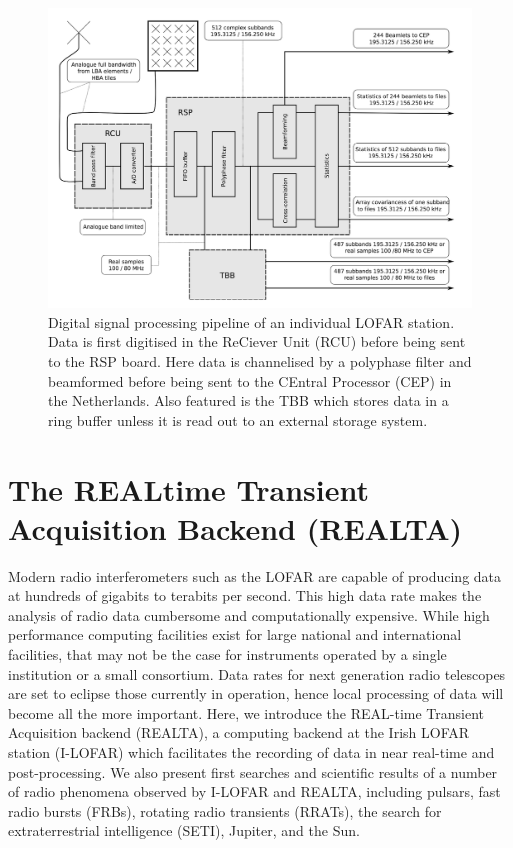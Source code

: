 \begin{figure}[ht]
    \centering
    \includegraphics[width=0.75\columnwidth]{Images/Digital_signal_processing.png}
    \caption[Digital signal processing pipeline of an individual LOFAR station.]{Digital signal processing pipeline of an individual LOFAR station. Data is first digitised in the ReCiever Unit (RCU) before being sent to the RSP board. Here data is channelised by a polyphase filter and beamformed before being sent to the CEntral Processor (CEP) in the Netherlands. Also featured is the TBB which stores data in a ring buffer unless it is read out to an external storage system. }
    \label{fig:sig_pipe}
\end{figure}

\section{The REALtime Transient Acquisition Backend (REALTA)}
Modern radio interferometers such as the LOFAR are capable of producing data at hundreds of gigabits to terabits per second. This high data rate makes the analysis of radio data cumbersome and computationally expensive. While high performance computing facilities exist for large national and international facilities, that may not be the case for instruments operated by a single institution or a small consortium. 
Data rates for next generation radio telescopes are set to eclipse those currently in operation, hence local processing of data will become all the more important.
Here, we introduce the REAL-time Transient Acquisition backend (REALTA), a computing backend at the Irish LOFAR station (I-LOFAR) which facilitates the recording of data in near real-time and post-processing. We also present first searches and scientific results of a number of radio phenomena observed by I-LOFAR and REALTA, including pulsars, fast radio bursts (FRBs), rotating radio transients (RRATs), the search for extraterrestrial intelligence (SETI), Jupiter, and the Sun.

